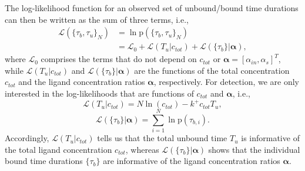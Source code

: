 \documentclass[twocolumn]{IEEEtran}
\newcommand{\p}{\mathrm{p}}
\begin{document}
The log-likelihood function for an observed set of unbound/bound time durations can then be written as the sum of three terms, i.e., 
\begin{align}\label{log_like}
\mathcal{L}(\{\tau_b,\tau_u \}_N) & = \ln\p(\{\tau_b,\tau_u \}_N) \\ \nonumber
& = \mathcal{L}_0  + \mathcal{L}\left(T_u | c_{tot}\right)  + \mathcal{L} \left(\{\tau_b \} | \bm{\alpha}\right), 
\end{align}
where $\mathcal{L}_0$ comprises the terms that do not depend on $c_{tot}$ or $\bm{\alpha} = [\alpha_{in}, \alpha_s]^T$, while $\mathcal{L}\left(T_u | c_{tot}\right) $ and $\mathcal{L} \left(\{\tau_b \} | \bm{\alpha}\right)$ are the functions of the total concentration $c_{tot}$ and the ligand concentration ratios $\bm{\alpha}$, respectively. For detection, we are only interested in the log-likelihoods that are functions of $c_{tot}$ and $\bm{\alpha}$, i.e.,
\begin{equation}
\mathcal{L}\left(T_u | c_{tot}\right) = N \ln(c_{tot})-k^+ c_{tot} T_u, \label{eq:likelihoodtotalligand}
\end{equation}
\begin{equation}\label{l2}
\mathcal{L} \left(\{\tau_b \} | \bm{\alpha}\right) = \sum_{i=1}^{N} \ln \p\left(\tau_{b,i}\right).
\end{equation}
Accordingly, $\mathcal{L}\left(T_u | c_{tot}\right)$ tells us that the total unbound time $T_u$ is informative of the total ligand concentration $c_{tot}$, whereas $\mathcal{L} \left(\{\tau_b \} | \bm{\alpha}\right)$ shows that the individual bound time durations $\{\tau_b \}$ are informative of the ligand concentration ratios $\bm{\alpha}$. 
\end{document}
